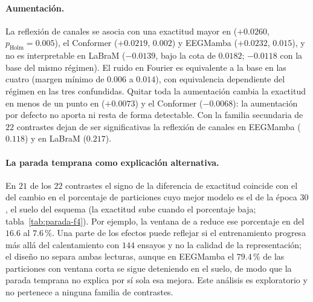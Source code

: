 \paragraph{Aumentación.} La reflexión de canales se asocia con una exactitud mayor en \eegnet{}
($+0.0260$, $p_{\text{Holm}} = 0.005$), el Conformer ($+0.0219$, $0.002$) y EEGMamba ($+0.0232$, $0.015$),
y no es interpretable en LaBraM ($-0.0139$, bajo la cota de $0.0182$; $-0.0118$ con la base del mismo
régimen). El ruido en Fourier es equivalente a la base en las cuatro (margen mínimo de $0.006$ a $0.014$),
con equivalencia dependiente del régimen en las tres confundidas. Quitar toda la aumentación cambia la
exactitud en menos de un punto en \eegnet{} ($+0.0073$) y el Conformer ($-0.0068$): la aumentación por
defecto no aporta ni resta de forma detectable. Con la familia secundaria de $22$ contrastes dejan de ser
significativas la reflexión de canales en EEGMamba ($0.118$) y en LaBraM ($0.217$).

\paragraph{La parada temprana como explicación alternativa.} En $21$ de los $22$ contrastes el signo de la
diferencia de exactitud coincide con el del cambio en el porcentaje de particiones cuyo mejor modelo es el
de la época $30$, el suelo del esquema (la exactitud sube cuando el porcentaje baja;
tabla~\ref{tab:parada-f4}). Por ejemplo, la ventana de  a  reduce ese porcentaje en \eegnet{}
del $16.6$ al $7.6$\,\%. Una parte de los efectos puede reflejar si el entrenamiento progresa más allá del
calentamiento con $144$ ensayos y no la calidad de la representación; el diseño no separa ambas lecturas,
aunque en EEGMamba el $79.4$\,\% de las particiones con ventana corta se sigue deteniendo en el suelo, de
modo que la parada temprana no explica por sí sola esa mejora. Este análisis es exploratorio y no
pertenece a ninguna familia de contrastes.

